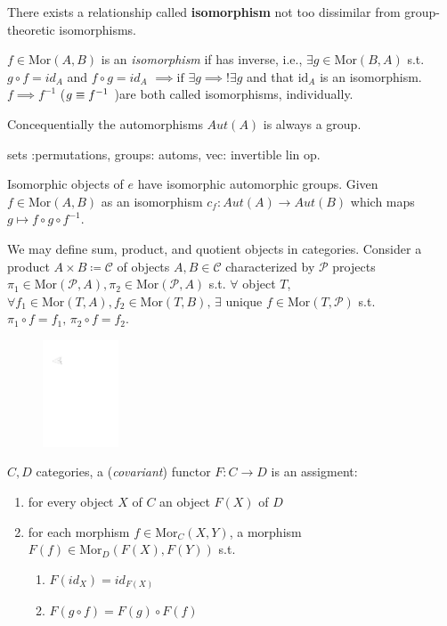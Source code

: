 \documentclass{report}
\begin{document}
There exists a relationship called \textbf{isomorphism} not too dissimilar from group-theoretic isomorphisms. 

\begin{definition}[Isomorphism]
  \( f \in  \text{Mor}(A,B) \) is an \textit{isomorphism} if has inverse, i.e., \( \exists g \in  \text{Mor}(B,A) \) s.t. \( g \circ f =id_A \) and \( f \circ g =id_A \) \( \implies \text{if }\exists g \implies !\exists g \) and that \( \text{id}_A \) is an isomorphism. \( f \implies f^{-1} \) (\( g\equiv f^{-1} \\ \) )are both called isomorphisms, individually. 
  
\end{definition}
  Concequentially the automorphisms \( Aut(A) \) is always a group. 

sets :permutations, groups: automs, vec: invertible lin op. 

Isomorphic objects of \( e \) have isomorphic automorphic groups. Given \( f \in  \text{Mor}(A,B) \) as an isomorphism \( c_f:Aut(A) \to  Aut(B) \) which maps \( g \mapsto f \circ g \circ f^{-1} \). 

We may define sum, product, and quotient objects in categories. Consider a product \( A\times B \coloneqq \mathcal{C} \) of objects \( A,B \in  \mathscr{C} \) characterized by \( \mathcal{P} \) projects \( \pi_1 \in \text{Mor}(\mathcal{P},A), \pi_{2}\in \text{Mor}(\mathcal{P}, A) \) s.t. \( \forall  \) object \( T \), \( \forall f_{1}\in \text{Mor}(T,A), f_{2}\in \text{Mor}(T,B), \, \exists \) unique \( f \in \text{Mor}(T,\mathcal{P}) \) s.t. \( \pi_{1} \circ f =f_1, \, \pi_{2}\circ f=f_{2} \). 

\begin{figure}[ht]
    \centering
 \includegraphics[width=0.2\textwidth]{./figures/tcat.pdf}
    \caption{}
    \label{fig:tcat}
\end{figure}

\begin{definition}[functor]
  \( C,D \) categories, a (\textit{covariant}) functor \( F:C \to  D \) is an assigment:
  \begin{enumerate}
    \item for every object \( X \) of \( C \) an object \( F(X) \) of \( D \)
    \item for each morphism \( f \in  \text{Mor}_C(X,Y) \), a morphism \( F(f) \in  \text{Mor}_D(F(X),F(Y)) \) s.t. \begin{enumerate}
        \item \( F(id_X)=id_{F(X)} \)
        \item \( F(g \circ f)= F(g)\circ F(f) \)
    \end{enumerate}
  \end{enumerate}
\end{definition}
\end{document}
